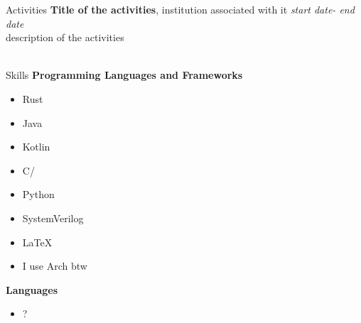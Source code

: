 	\begin{rSection}{Activities}
		{\bf Title of the activities}{, institution associated with it} \hfill {\em start date- end date}\\
		description of the activities\\\\
	\end{rSection}
	
	\begin{rSection}{Skills}
		{\bf Programming Languages and Frameworks }
		\begin{multicols}{3}
			\begin{itemize}
				\item Rust
				\item Java
				\item Kotlin
				\item C/\CC
				\item Python
				\item SystemVerilog
				\item \LaTeX
				\item I use Arch btw
			\end{itemize}
		\end{multicols}

		{\bf Languages}
		\begin{itemize}
			\item ?
		\end{itemize}
	\end{rSection}

